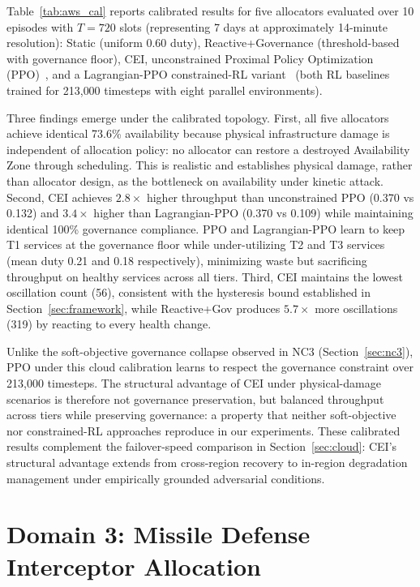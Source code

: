 \documentclass[runningheads]{llncs}
\begin{document}
Table~\ref{tab:aws_cal} reports calibrated results for five allocators evaluated over 10 episodes with $T = 720$ slots (representing 7 days at approximately 14-minute resolution): Static (uniform 0.60 duty), Reactive+Governance (threshold-based with governance floor), CEI, unconstrained Proximal Policy Optimization (PPO)~\cite{schulman}, and a Lagrangian-PPO constrained-RL variant~\cite{achiam} (both RL baselines trained for 213{,}000 timesteps with eight parallel environments).

Three findings emerge under the calibrated topology. First, all five allocators achieve identical 73.6\% availability because physical infrastructure damage is independent of allocation policy: no allocator can restore a destroyed Availability Zone through scheduling. This is realistic and establishes physical damage, rather than allocator design, as the bottleneck on availability under kinetic attack. Second, CEI achieves $2.8\times$ higher throughput than unconstrained PPO (0.370 vs 0.132) and $3.4\times$ higher than Lagrangian-PPO (0.370 vs 0.109) while maintaining identical 100\% governance compliance. PPO and Lagrangian-PPO learn to keep T1 services at the governance floor while under-utilizing T2 and T3 services (mean duty 0.21 and 0.18 respectively), minimizing waste but sacrificing throughput on healthy services across all tiers. Third, CEI maintains the lowest oscillation count (56), consistent with the hysteresis bound established in Section~\ref{sec:framework}, while Reactive+Gov produces $5.7\times$ more oscillations (319) by reacting to every health change.

Unlike the soft-objective governance collapse observed in NC3 (Section~\ref{sec:nc3}), PPO under this cloud calibration learns to respect the governance constraint over 213{,}000 timesteps. The structural advantage of CEI under physical-damage scenarios is therefore not governance preservation, but balanced throughput across tiers while preserving governance: a property that neither soft-objective nor constrained-RL approaches reproduce in our experiments. These calibrated results complement the failover-speed comparison in Section~\ref{sec:cloud}: CEI's structural advantage extends from cross-region recovery to in-region degradation management under empirically grounded adversarial conditions.

\section{Domain 3: Missile Defense Interceptor Allocation}
\label{sec:missile}
\end{document}

